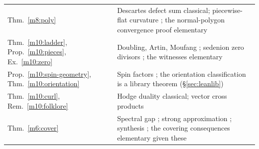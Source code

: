 \documentclass[11pt,reqno]{amsart}
\theoremstyle{definition}
\theoremstyle{remark}
\numberwithin{equation}{section}
\begin{document}
\begin{center}
\begin{tabular}{@{}p{}p{}@{}}
Thm.~\ref{m8:poly} & Descartes defect sum classical; piecewise-flat curvature \cite{m8:cheeger}; the normal-polygon convergence proof elementary\\
Thm.~\ref{m10:ladder}, Prop.~\ref{m10:pieces}, Ex.~\ref{m10:zero} & Doubling, Artin, Moufang \cite{Baez02,Schafer66}; sedenion zero divisors \cite{m10:Moreno}; the witnesses elementary\\
Prop.~\ref{m10:spin-geometry}, Thm.~\ref{m10:orientation} & Spin factors \cite{m2:JNW,m10:HOS}; the orientation classification is a library theorem (\S\ref{sec:leanlib})\\
Thm.~\ref{m10:curl}, Rem.~\ref{m10:folklore} & Hodge duality classical; vector cross products \cite{m10:Eckmann,m10:BrownGray}\\
Thm.~\ref{m6:cover} & Spectral gap \cite{m6:LPS,m6:PS}; strong approximation \cite{m6:Sardari}; synthesis \cite{m6:RS}; the covering consequences elementary given these\\
\bottomrule
\end{tabular}
\end{center}
\end{document}
